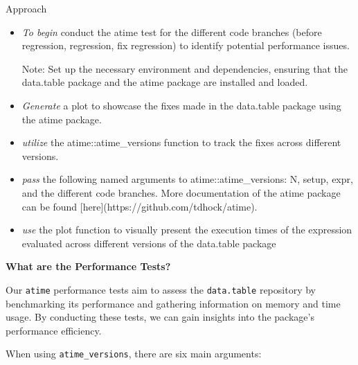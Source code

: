 \noindent Approach

\begin{itemize}
    

\item \textit{To begin} conduct the atime test for the different code branches (before regression, regression, fix regression) to identify potential performance issues. 
\vspace{0.1in}

\noindent Note: Set up the necessary environment and dependencies, ensuring that the data.table package and the atime package are installed and loaded.
\vspace{0.1in}

\item \textit{Generate} a plot to showcase the fixes made in the data.table package using the atime package.

\vspace{0.1in}
\item \textit{utilize} the atime::atime\_versions function to track the fixes across different versions.
\vspace{0.1in}

\item \textit{pass} the following named arguments to atime::atime\_versions: N, setup, expr, and the different code branches. More documentation of the atime package can be found [here](https://github.com/tdhock/atime). 
\vspace{0.1in}

\item \textit{use} the plot function to visually present the execution times of the expression evaluated across different versions of the data.table package

\end{itemize}

\textbf{What are the Performance Tests?}

Our \texttt{atime} performance tests aim to assess the \texttt{data.table} repository by benchmarking its performance and gathering information on memory and time usage. By conducting these tests, we can gain insights into the package’s performance efficiency.

When using \texttt{atime\_versions}, there are six main arguments:

